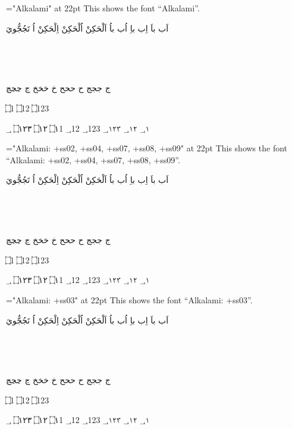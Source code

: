 

\vsize=9.5in
\nopagenumbers
\parindent=0pt
\def\testFont#1{
  \font\x="#1" at 22pt \x
    This shows the font “#1”. \par\touching\par\imala\par\wagaf\par\jeem\par\endayahA\par\endayahB \number\par}

\baselineskip=20pt

\def\touching{\beginR اَب باَ  اِب باِ اُب باُ  اَلْحَكِنْ اُلْحَكِنْ اِلْحَكِنْ  اُ تَجُجُّويَ  \endR} %
\def\number{\beginR ؀1 ؀12 ؀123 ؀١ ؀١٢ ؀١٢٣ \endR} 
\def\endayahA{\beginR ۝1   ۝12   ۝123   \endR} %
\def\endayahB{\beginR ۝١   ۝١٢   ۝١٢٣ \endR} %
\def\imala{\beginR بٜ  \endR} %
\def\wagaf{\beginR ؿ ؿؿؿ ڟ ڟڟڟ ݑ ݑݑݑ ݣ ݣݣݣ ࣃ ࣃࣃࣃ ࣄ ࣄࣄࣄ \endR} %
\def\jeem{\beginR ج ججج ح ححح خ خخخ ڃ ڃڃڃ   \endR} %
\def\lamalef{\beginR لإ ‍لإ لَإِ ‍لَإِ لأ ‍لأ لَأَ ‍لَأَ لإ ‍لإ لَإِ ‍لَإِ لأ ‍لأ لَأَ ‍لَأَ لآ ‍لآ لَآَ ‍لَآَ لا ‍لا لَاَ ‍لَاَ \endR} 
\bigskip


\testFont{Alkalami}

\bigskip

\testFont{Alkalami:
       +ss02, +ss04, +ss07, +ss08, +ss09}

\bigskip

\testFont{Alkalami:
       +ss03}

\bigskip


\bigskip

\bye

